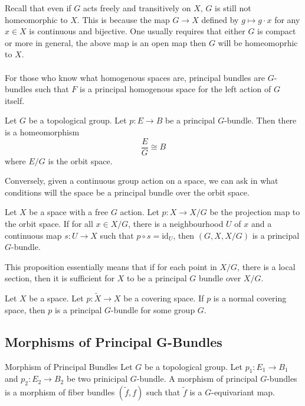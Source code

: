 \documentclass[a4paper]{article}
\begin{document}
Recall that even if $G$ acts freely and transitively on $X$, $G$ is still not homeomorphic to $X$. This is because the map $G\to X$ defined by $g\mapsto g\cdot x$ for any $x\in X$ is continuous and bijective. One usually requires that either $G$ is compact or more in general, the above map is an open map then $G$ will be homeomoprhic to $X$. \\~\\

For those who know what homogenous spaces are, principal bundles are $G$-bundles such that $F$ is a principal homogenous space for the left action of $G$ itself. 

\begin{prp}{}{} Let $G$ be a topological group. Let $p:E\to B$ be a principal $G$-bundle. Then there is a homeomorphism $$\frac{E}{G}\cong B$$ where $E/G$ is the orbit space. 
\end{prp}

Conversely, given a continuous group action on a space, we can ask in what conditions will the space be a principal bundle over the orbit space. 

\begin{prp}{}{} Let $X$ be a space with a free $G$ action. Let $p:X\to X/G$ be the projection map to the orbit space. If for all $x\in X/G$, there is a neighbourhood $U$ of $x$ and a continuous map $s:U\to X$ such that $p\circ s=\text{id}_U$, then $(G,X,X/G)$ is a principal $G$-bundle. 
\end{prp}

This proposition essentially means that if for each point in $X/G$, there is a local section, then it is sufficient for $X$ to be a principal $G$ bundle over $X/G$. 

\begin{prp}{}{} Let $X$ be a space. Let $p:\tilde{X}\to X$ be a covering space. If $p$ is a normal covering space, then $p$ is a principal $G$-bundle for some group $G$. 
\end{prp}

\subsection{Morphisms of Principal G-Bundles}
\begin{defn}{Morphism of Principal Bundles}{} Let $G$ be a topological group. Let $p_1:E_1\to B_1$ and $p_2:E_2\to B_2$ be two prinicipal $G$-bundle. A morphism of principal $G$-bundles is a morphism of fiber bundles $(\tilde{f},f)$ such that $\tilde{f}$ is a $G$-equivariant map. 
\end{defn}
\end{document}
